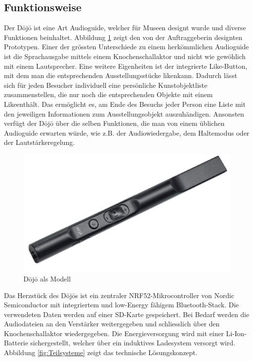 \subsection{Funktionsweise} \label{sec:funktionsweise}
Der Dōjō ist eine Art Audioguide, welcher für Museen designt wurde und diverse Funktionen beinhaltet. Abbildung \ref{fig:Funktion Dojo} zeigt den von der Auftraggeberin designten Prototypen. Einer der grössten Unterschiede zu einem herkömmlichen Audioguide ist die Sprachausgabe mittels einem Knochenschallaktor und nicht wie gewöhlich mit einem Lautsprecher. Eine weitere Eigenheiten ist der integrierte \glqq Like\grqq-Button, mit dem man die entsprechenden Ausstellungsstücke \glqq liken\grqq kann. Dadurch lässt sich für jeden Besucher individuell eine persönliche Kunstobjektliste zusammenstellen, die nur noch die entsprechenden Objekte mit einem \glqq Like\grqq enthält. Das ermöglicht es, am Ende des Besuchs jeder Person eine Liste mit den jeweiligen Informationen zum Ausstellungsobjekt auszuhändigen. Ansonsten verfügt der Dōjō über die selben Funktionen, die man von einem üblichen Audioguide erwarten würde, wie z.B. der Audiowiedergabe, dem Haltemodus oder der Lautstärkeregelung.

\begin{figure}[H]
	\begin{center}
		\includegraphics[width=120mm]{data/Dojo.png}
		\caption[Dōjō als Modell]{Dōjō als Modell} %
		\label{fig:Funktion Dojo}
	\end{center}
\end{figure}

Das Herzstück des Dōjōs ist ein zentraler NRF52-Mikrocontroller von Nordic Semiconductor mit integriertem und low-Energy fähigem Bluetooth-Stack. Die verwendeten Daten werden auf einer SD-Karte gespeichert. Bei Bedarf werden die Audiodateien an den Verstärker weitergegeben und schliesslich über den Knochenschallaktor wiedergegeben. Die Energieversorgung wird mit einer Li-Ion-Batterie sichergestellt, welcher über ein induktives Ladesystem versorgt wird. Abbildung \ref{fig:Teilsysteme} zeigt das technische Lösungskonzept.

